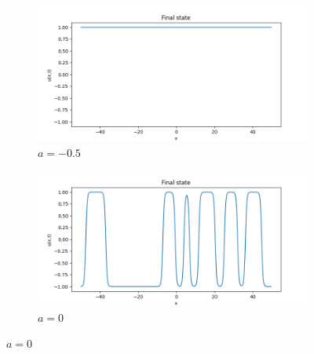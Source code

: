 \documentclass[a4paper,11pt]{article}
\begin{document}
\begin{figure}[H]
  \centering
  \begin{subfigure}[b]{0.45\textwidth}
    \centering
    \includegraphics[width=\textwidth]{tex_gif_figures/result_am0p5_eps0p5_final.png}
    \caption{$a = -0.5$}
  \end{subfigure}
  \hfill
  \begin{subfigure}[b]{0.45\textwidth}
    \centering
    \includegraphics[width=\textwidth]{tex_gif_figures/result_a0_eps0p5_final.png}
    \caption{$a = 0$}
  \end{subfigure}


\end{figure}
\end{document}
